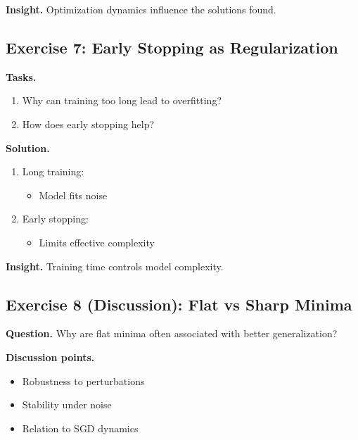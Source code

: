 \medskip

\noindent
\textbf{Insight.}  
Optimization dynamics influence the solutions found.

\subsection{Exercise 7: Early Stopping as Regularization}

\textbf{Tasks.}
\begin{enumerate}
    \item Why can training too long lead to overfitting?
    \item How does early stopping help?
\end{enumerate}

\medskip

\noindent
\textbf{Solution.}

\begin{enumerate}
\item Long training:
\begin{itemize}
    \item Model fits noise
\end{itemize}

\item Early stopping:
\begin{itemize}
    \item Limits effective complexity
\end{itemize}
\end{enumerate}

\medskip

\noindent
\textbf{Insight.}  
Training time controls model complexity.

\subsection{Exercise 8 (Discussion): Flat vs Sharp Minima}

\textbf{Question.}  
Why are flat minima often associated with better generalization?

\medskip

\noindent
\textbf{Discussion points.}

\begin{itemize}
    \item Robustness to perturbations
    \item Stability under noise
    \item Relation to SGD dynamics
\end{itemize}

